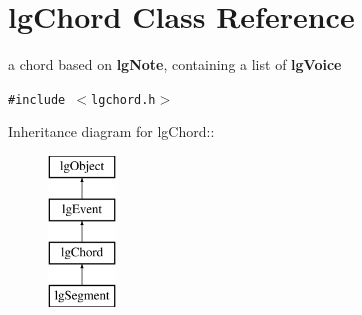 \section{lg\-Chord Class Reference}
\label{classlgChord}
a chord based on {\bf lg\-Note}, containing a list of {\bf lg\-Voice}  


{\tt \#include $<$lgchord.h$>$}

Inheritance diagram for lg\-Chord::\begin{figure}[H]
\begin{center}
\leavevmode
\includegraphics[height=4cm]{classlgChord}
\end{center}
\end{figure}
